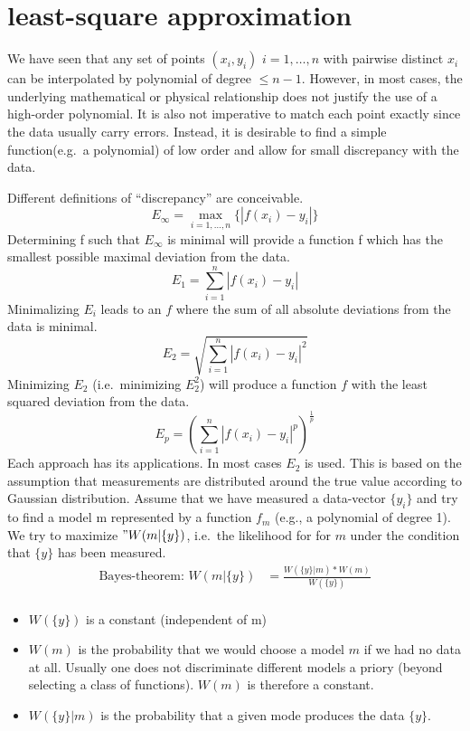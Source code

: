 \chapter{least-square approximation}\label{ch:least-square-approximation}
We have seen that any set of points $(x_i, y_i)$ $i = 1, \ldots, n$ with pairwise distinct $x_i$ can be interpolated by polynomial of degree $\leq n-1$.
However, in most cases, the underlying mathematical or physical relationship does not justify the use of a high-order polynomial.
It is also not imperative to match each point exactly since the data usually carry errors.
Instead, it is desirable to find a simple function(e.g.\ a polynomial) of low order and allow for small discrepancy with the data.

Different definitions of ``discrepancy'' are conceivable.
\begin{equation*}
    E_{\infty} = \max_{i=1,\ldots,n} \{ |f(x_i) - y_i| \}
\end{equation*}
Determining f such that $E_\infty$ is minimal will provide a function f which has the smallest possible maximal deviation from the data.
\begin{equation*}
    E_1 = \sum_{i=1}^n |f(x_i) - y_i|
\end{equation*}
Minimalizing $E_i$ leads to an $f$ where the sum of all absolute deviations from the data is minimal.
\begin{equation*}
    E_2 = \sqrt{\sum_{i=1}^n |f(x_i) - y_i|^2}
\end{equation*}
Minimizing $E_2$ (i.e.\ minimizing $E_2^2$) will produce a function $f$ with the least squared deviation from the data.
\begin{equation*}
    E_p = \left( \sum_{i=1}^n |f(x_i) - y_i|^p \right)^{\frac{1}{p}}
\end{equation*}
Each approach has its applications.
In most cases $E_2$ is used.
This is based on the assumption that measurements are distributed around the true value according to Gaussian distribution.
Assume that we have measured a data-vector $\{ y_i \}$ and try to find a model m represented by a function $f_m$ (e.g., a polynomial of degree 1).
We try to maximize $"W(m \vert \{ y\})$, i.e.\ the likelihood for for $m$ under the condition that $\{ y \}$ has been measured.
\begin{align*}
    \text{Bayes-theorem: } W(m \vert \{ y \}) &= \frac{W(\{ y \} \vert m) * W(m)}{W(\{ y \})} \\
\end{align*}
\begin{itemize}
    \item $W(\{ y\})$ is a constant (independent of m)
    \item $W(m)$ is the probability that we would choose a model $m$ if we had no data at all.
    Usually one does not discriminate different models a priory (beyond selecting a class of functions).
    $W(m)$ is therefore a constant.
    \item $W(\{y \} \vert m)$ is the probability that a given mode produces the data $\{ y \}$.
\end{itemize}
